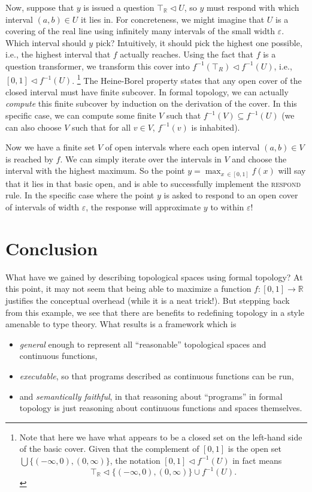 \documentclass{article}
\newcommand{\cov}{\vartriangleleft}
\newcommand{\R}{\mathbb{R}}
\newcommand{\irule}[1]{\textsc{#1}}
\begin{document}
Now, suppose that $y$ is issued a question $\top_\R \cov U$, so $y$ must respond with which interval $(a, b) \in U$ it lies in. For concreteness, we might imagine that $U$ is a covering of the real line using infinitely many intervals of the small width $\varepsilon$. Which interval should $y$ pick? Intuitively, it should pick the highest one possible, i.e., the highest interval that $f$ actually reaches. Using the fact that $f$ is a question transformer, we transform this cover into $f^{-1}(\top_R) \cov f^{-1}(U)$, i.e., $[0, 1] \cov f^{-1}(U)$.
\footnote{Note that here we have what appears to be a closed set on the left-hand side of the basic cover. Given that the complement of $[0,1]$ is the open set $\bigcup \{(-\infty, 0), (0, \infty)\}$, the notation $[0,1] \cov f^{-1}(U)$ in fact means
\[
\top_\R \cov \{(-\infty, 0), (0, \infty)\} \cup f^{-1}(U).
\]
}
The Heine-Borel property states that any open cover of the closed interval must have finite subcover. In formal topology, we can actually \emph{compute} this finite subcover by induction on the derivation of the cover. In this specific case, we can compute some finite $V$ such that $f^{-1}(V) \subseteq f^{-1}(U)$ (we can also choose $V$ such that for all $v \in V$, $f^{-1}(v)$ is inhabited).

Now we have a finite set $V$ of open intervals where each open interval $(a, b) \in V$ is reached by $f$. We can simply iterate over the intervals in $V$ and choose the interval with the highest maximum. So the point $y = \max_{x\ \in [0,1]} f(x)$ will say that it lies in that basic open, and is able to successfully implement the \irule{respond} rule. In the specific case where the point $y$ is asked to respond to an open cover of intervals of width $\varepsilon$, the response will approximate $y$ to within $\varepsilon$!

\section{Conclusion}

What have we gained by describing topological spaces using formal topology? At this point, it may not seem that being able to maximize a function $f : [0, 1] \to \R$ justifies the conceptual overhead (while it is a neat trick!). But stepping back from this example, we see that there are benefits to redefining topology in a style amenable to type theory. What results is a framework which is
\begin{itemize}
\item \emph{general} enough to represent all ``reasonable''  topological spaces and continuous functions,
\item \emph{executable}, so that programs described as continuous functions can be run,
\item and \emph{semantically faithful}, in that reasoning about ``programs'' in formal topology is just reasoning about continuous functions and spaces themselves.
\end{itemize}
\end{document}
